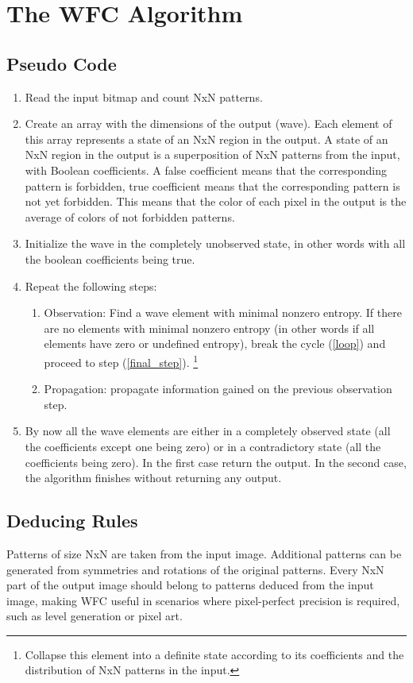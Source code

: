 \documentclass[shortabstract, english, inz]{iithesis}
\begin{document}
\chapter{The WFC Algorithm}
\label{chapter3}
\section{Pseudo Code}
\begin{enumerate}
    \item Read the input bitmap and count NxN patterns.
    \item Create an array with the dimensions of the output (wave). Each element of this array represents a state of an NxN region in the output. A state of an NxN region in the output is a superposition of NxN patterns from the input, with Boolean coefficients. A false coefficient means that the corresponding pattern is forbidden, true coefficient means that the corresponding pattern is not yet forbidden. This means that the color of each pixel in the output is the average of colors of not forbidden patterns.
    \item Initialize the wave in the completely unobserved state, in other words with all the boolean coefficients being true.
    \item \label{loop}Repeat the following steps:
    \begin{enumerate}
        \item Observation:
Find a wave element with minimal nonzero entropy. If there are no elements with minimal nonzero entropy (in other words if all elements have zero or undefined entropy), break the cycle (\ref{loop}) and proceed to step (\ref{final_step}).
\footnote{Collapse this element into a definite state according to its coefficients and the distribution of NxN patterns in the input.}
        \item Propagation: propagate information gained on the previous observation step.
    \end{enumerate}
    \item \label{final_step}By now all the wave elements are either in a completely observed state (all the coefficients except one being zero) or in a contradictory state (all the coefficients being zero). In the first case return the output. In the second case, the algorithm finishes without returning any output.
\end{enumerate}
\cite{MaximGumin}

\section{Deducing Rules}
Patterns of size NxN are taken from the input image. Additional patterns can be generated from symmetries and rotations of the original patterns. Every NxN part of the output image should belong to patterns deduced from the input image, making WFC useful in scenarios where pixel-perfect precision is required, such as level generation or pixel art. \cite{MaximGumin}
\end{document}
